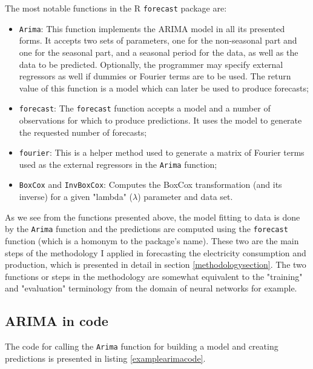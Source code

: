 \documentclass[12pt,a4paper,titlepage]{report}
\begin{document}
The most notable functions in the R \texttt{forecast} package are:
\begin{itemize}
    \item \texttt{Arima}: This function implements the ARIMA model in all its presented forms. It accepts two sets of parameters, one for the non-seasonal part and one for the seasonal part, and a seasonal period for the data, as well as the data to be predicted. Optionally, the programmer may specify external regressors as well if dummies or Fourier terms are to be used. The return value of this function is a model which can later be used to produce forecasts;
    \item \texttt{forecast}: The \texttt{forecast} function accepts a model and a number of observations for which to produce predictions. It uses the model to generate the requested number of forecasts;
    \item \texttt{fourier}: This is a helper method used to generate a matrix of Fourier terms used as the external regressors in the \texttt{Arima} function;
    \item \texttt{BoxCox} and \texttt{InvBoxCox}: Computes the BoxCox transformation (and its inverse) for a given "lambda" ($ \lambda $) parameter and data set.
\end{itemize}

As we see from the functions presented above, the model fitting to data is done by the \texttt{Arima} function and the predictions are computed using the \texttt{forecast} function (which is a homonym to the package's name). These two are the main steps of the methodology I applied in forecasting the electricity consumption and production, which is presented in detail in section \ref{methodologysection}. The two functions or steps in the methodology are somewhat equivalent to the "training" and "evaluation" terminology from the domain of neural networks for example.


\subsection{ARIMA in code} \label{arimaincode}
The code for calling the \texttt{Arima} function for building a model and creating predictions is presented in listing \ref{examplearimacode}.
\end{document}
